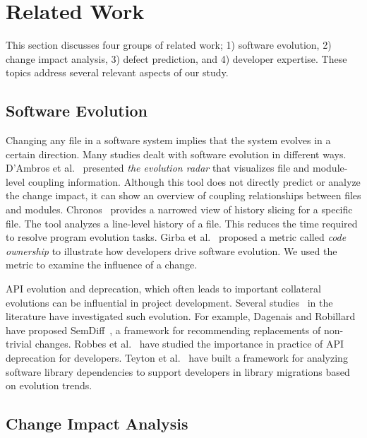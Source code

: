 \section{Related Work}
\label{sec:related}

This section discusses four groups of related work; 1) software evolution, 2)
change impact analysis, 3) defect prediction, and 4) developer expertise. These
topics address several relevant aspects of our study.

\subsection{Software Evolution}
Changing any file in a software system implies that the system evolves in a
certain direction. Many studies dealt with software evolution in different ways.
D'Ambros et al.~\cite{dambros_evolution_2006} presented \emph{the evolution
radar} that visualizes file and module-level coupling information. Although this
tool does not directly predict or analyze the change impact, it can show an
overview of coupling relationships between files and modules.
Chronos~\cite{servant_history_2012} provides a narrowed view of history
slicing for a specific file. The tool analyzes a line-level history of a file.
This reduces the time required to resolve program evolution tasks. Girba et
al.~\cite{girba_how_2005} proposed a metric called \emph{code ownership} to
illustrate how developers drive software evolution. We used the metric to
examine the influence of a change.

API evolution and deprecation, which often leads to important collateral evolutions
can be influential in project development. Several studies~\cite{Dagenais:2009:SAR:1555001.1555083,
robbes_how_2012,sawant_reaction_2016,Teyton:2014:SLM:2926316.2926322,Kim:2010:MAI:1831508.1831654,Dagenais:2011:RAC:2000799.2000805,6062100} in the literature have
investigated such evolution. For example, Dagenais and Robillard have proposed SemDiff~\cite{Dagenais:2009:SAR:1555001.1555083},
a framework for recommending replacements of non-trivial changes. Robbes et al.~\cite{robbes_how_2012}
have studied the importance in practice of API deprecation for developers. Teyton et al.~\cite{Teyton:2014:SLM:2926316.2926322} have built a framework for analyzing software library dependencies to support developers in library migrations based on evolution trends.



\subsection{Change Impact Analysis}


